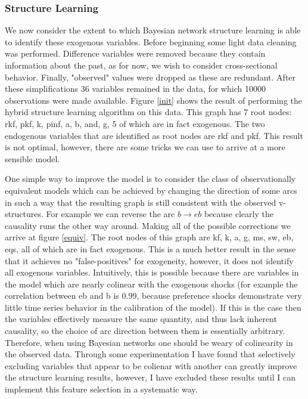 \documentclass{article}
\begin{document}
\subsubsection{Structure Learning}

We now consider the extent to which Bayesian network structure learning is able to identify these exogenous variables. Before beginning some light data cleaning was performed. Difference variables were removed because they contain information about the past, as for now, we wish to consider cross-sectional behavior. Finally, "observed" values were dropped as these are redundant. After these simplifications 36 variables remained in the data, for which 10000 observations were made available. Figure \ref{init} shows the result of performing the hybrid structure learning algorithm on this data. This graph has 7 root nodes: rkf, pkf, k, pinf, a, b, and, g, 5 of which are in fact exogenous. The two endogenous variables that are identified as root nodes are rkf and pkf. This result is not optimal, however, there are some tricks we can use to arrive at a more sensible model.

One simple way to improve the model is to consider the class of observationally equivalent models which can be achieved by changing the direction of some arcs in such a way that the resulting graph is still consistent with the observed v-structures. For example we can reverse the arc $b \rightarrow eb$ because clearly the causality runs the other way around. Making all of the possible corrections we arrive at figure \ref{equiv}. The root nodes of this graph are kf, k, a, g, ms, sw, eb, eqs, all of which are in fact exogenous. This is a much better result in the sense that it achieves no "false-positives" for exogeneity, however, it does not identify all exogenous variables. Intuitively, this is possible because there are variables in the model which are nearly colinear with the exogenous shocks (for example the correlation between eb and b is 0.99, because preference shocks demonstrate very little time series behavior in the calibration of the model). If this is the case then the variables effectively measure the same quantity, and thus lack inherent causality, so the choice of arc direction between them is essentially arbitrary. Therefore, when using Bayesian networks one should be weary of colinearity in the observed data. Through some experimentation I have found that selectively excluding variables that appear to be colienar with another can greatly improve the structure learning results, however, I have excluded these results until I can implement this feature selection in a systematic way.
\end{document}
